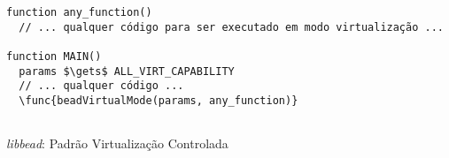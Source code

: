 \begin{pseudocode}
\begin{lstlisting}[language=pseudocode, style=pseudocode]
function any_function()
  // ... qualquer código para ser executado em modo virtualização ...      

function MAIN()
  params $\gets$ ALL_VIRT_CAPABILITY
  // ... qualquer código ...
  \func{beadVirtualMode(params, any_function)}
  
\end{lstlisting}

  \caption{\emph{libbead}: Padrão Virtualização Controlada}
  \label{alg:libBeadvirtMode}
\end{pseudocode}
